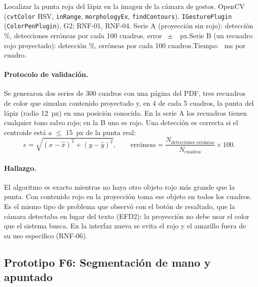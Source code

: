{Localizar la punta roja del lápiz en la imagen de la cámara de gestos.}
{OpenCV (\texttt{cvtColor} HSV, \texttt{inRange}, \texttt{morphologyEx}, \texttt{findContours}).}
{\texttt{IGesturePlugin} (\texttt{ColorPenPlugin}).}
{G2; RNF-01, RNF-04.}
{ Serie A (proyección sin rojo): detección \FCincoDeteccionPct\%, \FCincoFalsasPor{} detecciones erróneas por cada 100 cuadros, error \FCincoErrorPx~$\pm$~\FCincoErrorSdPx~px.\newline Serie B (un recuadro rojo proyectado): detección \FCincoDeteccionRojoPct\%, \FCincoFalsasRojoPor{} erróneas por cada 100 cuadros.\newline Tiempo: \FCincoTiempoMs~ms por cuadro.}

\paragraph{Protocolo de validación.} Se generaron dos series de 300 cuadros con una página del PDF, tres recuadros de color que simulan contenido proyectado y, en 4 de cada 5 cuadros, la punta del lápiz (radio 12~px) en una posición conocida. En la serie A los recuadros tienen cualquier tono salvo rojo; en la B uno es rojo. Una detección es correcta si el centroide está a $\leq$ 15~px de la punta real:
\begin{equation}
e=\sqrt{(x-\hat{x})^2+(y-\hat{y})^2},\qquad \text{erróneas}=\frac{N_{\text{detecciones erróneas}}}{N_{\text{cuadros}}}\times100.
\end{equation}

\paragraph{Hallazgo.} El algoritmo es exacto mientras no haya otro objeto rojo más grande que la punta. Con contenido rojo en la proyección toma ese objeto en todos los cuadros. Es el mismo tipo de problema que \citet{ibaceta2023} observó con el botón de resaltado, que la cámara detectaba en lugar del texto (EFD2): la proyección no debe usar el color que el sistema busca. En la interfaz nueva se evita el rojo y el amarillo fuera de su uso específico (RNF-06).

\subsection{Prototipo F6: Segmentación de mano y apuntado}

